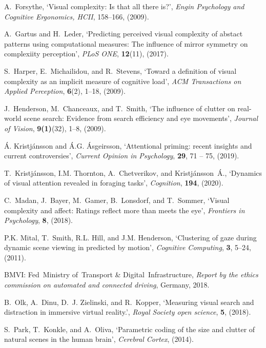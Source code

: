 \documentclass[a4paper]{article}
\begin{document}
\begin{thebibliography}{10}
A.~Forsythe, `Visual complexity: Is that all there is?', {\em Engin Psychology
  and Cognitive Ergonomics, HCII},  158--166, (2009).

A.~Gartus and H.~Leder, `Predicting perceived visual complexity of abstact
  patterns using computational measures: The influence of mirror symmetry on
  complexiity perception', {\em PLoS ONE}, {\bf 12}(11), (2017).

S.~Harper, E.~Michailidou, and R.~Stevens, `Toward a definition of visual
  complexity as an implicit measure of cognitive load', {\em ACM Transactions
  on Applied Perception}, {\bf 6}(2),  1--18, (2009).

J.~Henderson, M.~Chanceaux, and T.~Smith, `The influence of clutter on
  real-world scene search: Evidence from search efficiency and eye movements',
  {\em Journal of Vision}, {\bf 9(1)}(32),  1--8, (2009).

\'A. Kristj\'ansson and \'A.G. \'Asgeirsson, `Attentional priming: recent
  insights and current controversies', {\em Current Opinion in Psychology},
  {\bf 29},  71 -- 75, (2019).

T.~Kristj\'ansson, I.M. Thornton, A.~Chetverikov, and Kristj\'ansson~\'A., 
`Dynamics of visual attention revealed in foraging
  tasks', {\em Cognition}, {\bf 194}, (2020).

C.~Madan, J.~Bayer, M.~Gamer, B.~Lonsdorf, and T.~Sommer, `Visual complexity
  and affect: Ratings reflect more than meets the eye', {\em Frontiers in
  Psychology}, {\bf 8}, (2018).

P.K. Mital, T.~Smith, R.L. Hill, and J.M. Henderson, `Clustering of gaze during
  dynamic scene viewing in predicted by motion', {\em Cognitive Computing},
  {\bf 3},  5--24, (2011).

BMVI: Fed~Ministry of~Transport \& Digital~Infrastructure, {\em Report by the
  ethics commission on automated and connected driving}, Germany, 2018.

B.~Olk, A.~Dinu, D.~J. Zielinski, and R.~Kopper, `Measuring visual search and
  distraction in immersive virtual reality.', {\em Royal Society open science},
  {\bf 5}, (2018).

S.~Park, T.~Konkle, and A.~Oliva, `Parametric coding of the size and clutter of
  natural scenes in the human brain', {\em Cerebral Cortex}, (2014).


\end{thebibliography}
\end{document}
